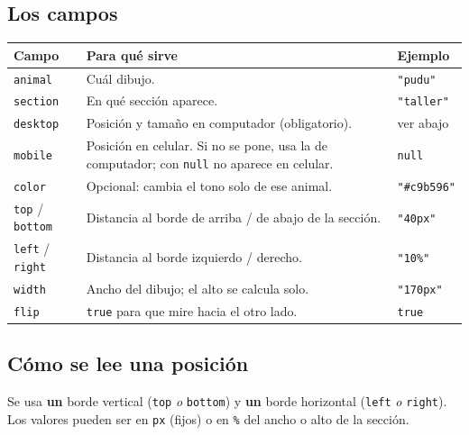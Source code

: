 \documentclass[11pt,a4paper]{article}
\newcommand{\code}[1]{\texttt{\small #1}}
\begin{document}
\subsection{Los campos}

\begin{center}
\renewcommand{\arraystretch}{1.25}
\begin{tabularx}{\textwidth}{@{}l X l@{}}
\toprule
\textbf{Campo} & \textbf{Para qué sirve} & \textbf{Ejemplo} \\
\midrule
\code{animal}  & Cuál dibujo. & \code{"pudu"} \\
\code{section} & En qué sección aparece. & \code{"taller"} \\
\code{desktop} & Posición y tamaño en computador (obligatorio). & ver abajo \\
\code{mobile}  & Posición en celular. Si no se pone, usa la de computador; con \code{null} no aparece en celular. & \code{null} \\
\code{color}   & Opcional: cambia el tono solo de ese animal. & \code{"\#c9b596"} \\
\midrule
\code{top} / \code{bottom} & Distancia al borde de arriba / de abajo de la sección. & \code{"40px"} \\
\code{left} / \code{right} & Distancia al borde izquierdo / derecho. & \code{"10\%"} \\
\code{width}   & Ancho del dibujo; el alto se calcula solo. & \code{"170px"} \\
\code{flip}    & \code{true} para que mire hacia el otro lado. & \code{true} \\
\bottomrule
\end{tabularx}
\end{center}

\subsection{Cómo se lee una posición}

Se usa \textbf{un} borde vertical (\code{top} \emph{o} \code{bottom}) y \textbf{un} borde horizontal (\code{left} \emph{o} \code{right}). Los valores pueden ser en \code{px} (fijos) o en \code{\%} del ancho o alto de la sección.
\end{document}
